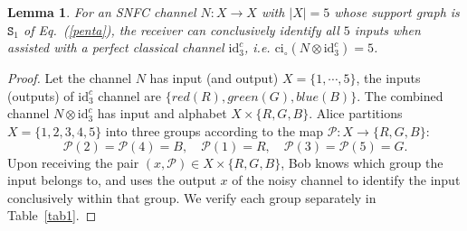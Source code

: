 \documentclass[10pt,a4paper]{amsart}
\newtheorem{lemma}{Lemma}
\begin{document}
\begin{lemma}\label{lemma1}
For an SNFC channel $N : X \to X$ with $|X| = 5$ whose support graph is $\mathtt{S}_1$ of Eq.~(\ref{penta}), the receiver can conclusively identify all $5$ inputs when assisted with a perfect classical channel $\mathrm{id}^c_3$, i.e. $\mathrm{ci}_\circ(N \otimes \mathrm{id}^c_3) = 5$.
\end{lemma}

\begin{proof}
Let the channel $N$ has input (and output) $X=\{1,\cdots,5\}$, the inputs (outputs) of $\mathrm{id}^c_3$ channel are $\{red (R), green (G), blue (B)\}$. The combined channel $N \otimes \mathrm{id}^c_3$ has input and alphabet $X \times \{R,G,B\}$. Alice partitions $X = \{1,2,3,4,5\}$ into three groups according to the map $\mathcal{P}: X \to \{R,G,B\}$:
\begin{equation*}
\mathcal{P}(2)= \mathcal{P}(4)= B,\quad \mathcal{P}(1) = R, \quad \mathcal{P}(3) = \mathcal{P}(5) = G.
\end{equation*}
Upon receiving the pair $(x, \mathcal{P})\in X\times\{R,G,B\}$, Bob knows which group the input belongs to, and uses the output $x$ of the noisy channel to identify the input conclusively within that group. We verify each group separately in Table~\ref{tab1}.


\end{proof}
\end{document}
